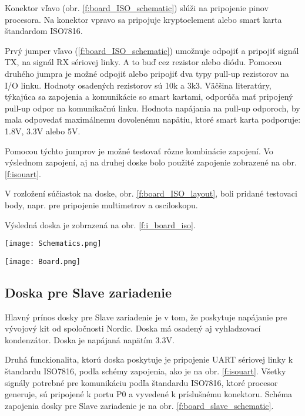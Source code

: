 \documentclass[12pt,a4wide,oneside,openright]{report}
\begin{document}
	Konektor vľavo (obr. \ref{f:board_ISO_schematic}) slúži na pripojenie pinov procesora. Na konektor vpravo sa pripojuje kryptoelement alebo smart karta štandardom ISO7816.
	
	Prvý jumper vľavo (\ref{f:board_ISO_schematic})  umožnuje odpojiť a pripojiť signál TX, na signál RX sériovej linky. A to buď cez rezistor alebo diódu.
	Pomocou druhého jumpra je možné odpojiť alebo pripojiť dva typy pull-up rezistorov na I/O linku. Hodnoty osadených rezistorov sú 10k a 3k3. 
	Väčšina literatúry, týkajúca sa zapojenia a komunikácie so smart kartami, odporúča mať pripojený  pull-up odpor na komunikačnú linku. Hodnota napájania na pull-up odporoch, by mala odpovedať maximálnemu dovolenému napätiu, ktoré smart karta podporuje: 1.8V, 3.3V alebo 5V.
	
	Pomocou týchto jumprov je možné testovať rôzne kombinácie zapojení. Vo výslednom zapojení, aj na druhej doske bolo použité zapojenie zobrazené na obr. \ref{f:isouart}.
	
	 V rozložení súčiastok na doske, obr. \ref{f:board_ISO_layout}, boli pridané testovaci body, napr. pre pripojenie multimetrov a osciloskopu.
	
	Výsledná doska je zobrazená na obr.  \ref{f:i_board_iso}.
	
	\begin{figure*}[!htb]
		\centering
		\texttt{[image: Schematics.png]}
		\caption{Testovacia doska pre konverziu UART na štandard ISO7816.}
		\label{f:board_ISO_schematic}
	\end{figure*}
	
	\begin{figure*}[!htb]
		\centering
		\texttt{[image: Board.png]}
		\caption{Rozloženie súčiastok na doske plošných spojov.}
		\label{f:board_ISO_layout}
	\end{figure*}
	
	\subsection{Doska pre Slave zariadenie} \label{slaveboard}

	Hlavný prínos dosky pre Slave zariadenie je v tom, že poskytuje napájanie pre vývojový kit od spoločnosti Nordic. Doska má osadený aj vyhladzovací kondenzátor.
	Doska je napájaná napätím 3.3V.
	
	Druhá funckionalita, ktorú doska poskytuje je pripojenie UART sériovej linky k štandardu ISO7816, podľa schémy zapojenia, ako je na obr. \ref{f:isouart}. Všetky signály potrebné pre komunikáciu podľa štandardu ISO7816, ktoré procesor generuje, sú pripojené k portu P0 a vyvedené k príslušnému konektoru.
	Schéma zapojenia dosky pre Slave zariadenie je na obr. \ref{f:board_slave_schematic}. 
	
\end{document}
